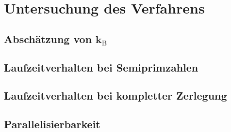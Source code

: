 \chapter{Untersuchung des Verfahrens}
\section{\texorpdfstring{Abschätzung von $\bm{k_\mathrm{B}}$}{Abschätzung von kB}}
\section{Laufzeitverhalten bei Semiprimzahlen}
\section{Laufzeitverhalten bei kompletter Zerlegung}
\section{Parallelisierbarkeit}
